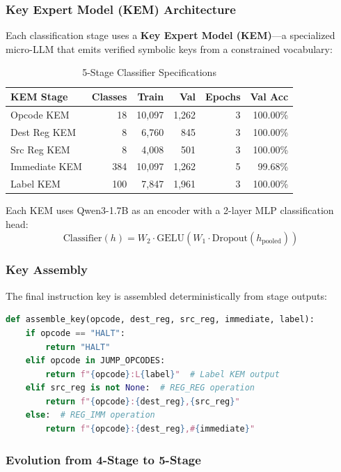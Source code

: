 \documentclass[11pt,a4paper]{article}
\begin{document}
\subsubsection{Key Expert Model (KEM) Architecture}

Each classification stage uses a \textbf{Key Expert Model (KEM)}---a specialized micro-LLM that emits verified symbolic keys from a constrained vocabulary:

\begin{table}[H]
\centering
\caption{5-Stage Classifier Specifications}
\label{tab:staged-classifier}
\begin{tabular}{@{}lrrrrr@{}}
\toprule
\textbf{KEM Stage} & \textbf{Classes} & \textbf{Train} & \textbf{Val} & \textbf{Epochs} & \textbf{Val Acc} \\
\midrule
Opcode KEM & 18 & 10,097 & 1,262 & 3 & 100.00\% \\
Dest Reg KEM & 8 & 6,760 & 845 & 3 & 100.00\% \\
Src Reg KEM & 8 & 4,008 & 501 & 3 & 100.00\% \\
Immediate KEM & 384 & 10,097 & 1,262 & 5 & 99.68\% \\
Label KEM & 100 & 7,847 & 1,961 & 3 & 100.00\% \\
\bottomrule
\end{tabular}
\end{table}

Each KEM uses Qwen3-1.7B as an encoder with a 2-layer MLP classification head:
\[
\text{Classifier}(h) = W_2 \cdot \text{GELU}(W_1 \cdot \text{Dropout}(h_{\text{pooled}}))
\]

\subsubsection{Key Assembly}

The final instruction key is assembled deterministically from stage outputs:

\begin{lstlisting}[language=Python]
def assemble_key(opcode, dest_reg, src_reg, immediate, label):
    if opcode == "HALT":
        return "HALT"
    elif opcode in JUMP_OPCODES:
        return f"{opcode}:L{label}"  # Label KEM output
    elif src_reg is not None:  # REG_REG operation
        return f"{opcode}:{dest_reg},{src_reg}"
    else:  # REG_IMM operation
        return f"{opcode}:{dest_reg},#{immediate}"
\end{lstlisting}

\subsubsection{Evolution from 4-Stage to 5-Stage}
\end{document}
